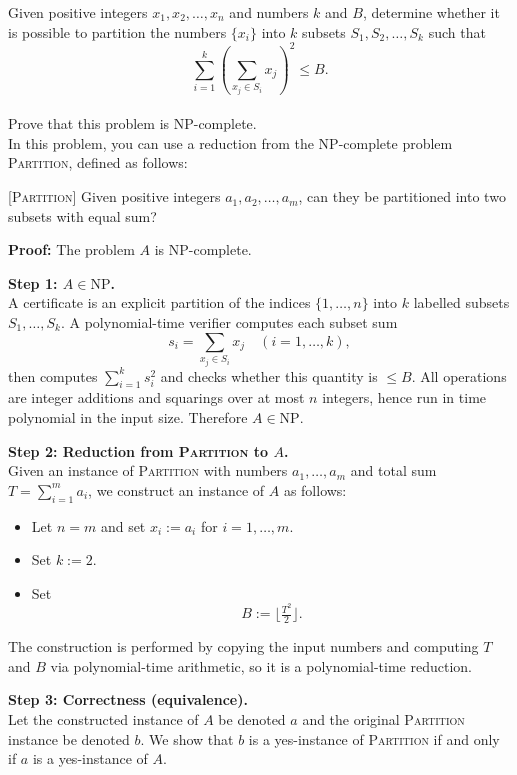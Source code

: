 \problem{}

Given positive integers $x_1, x_2, \ldots, x_n$ and numbers $k$ and $B$, determine whether it is possible to partition the numbers $\{x_i\}$ into $k$ subsets $S_1, S_2, \ldots, S_k$ such that
\[
\sum_{i=1}^{k} \left( \sum_{x_j \in S_i} x_j \right)^{2} \le B .
\]
\\
Prove that this problem is NP-complete. \\
In this problem, you can use a reduction from the NP-complete problem 
\textsc{Partition}, defined as follows:

[\textsc{Partition}]
Given positive integers \( a_1, a_2, \dots, a_m \), can they be partitioned into two subsets with equal sum?


\noindent \textbf{Proof:}
The problem \(A\) is NP-complete.

\noindent\textbf{Step 1: \(A \in \mathrm{NP}\).} \\
A certificate is an explicit partition of the indices \(\{1,\dots,n\}\) into \(k\) labelled subsets \(S_1,\dots,S_k\). A polynomial-time verifier computes each subset sum
\[
s_i=\sum_{x_j\in S_i} x_j \quad (i=1,\dots,k),
\]
then computes \(\sum_{i=1}^k s_i^2\) and checks whether this quantity is \(\le B\). All operations are integer additions and squarings over at most \(n\) integers, hence run in time polynomial in the input size. Therefore \(A\in\mathrm{NP}\).

\noindent\textbf{Step 2: Reduction from \textsc{Partition} to \(A\).} \\
Given an instance of \textsc{Partition} with numbers \(a_1,\dots,a_m\) and total sum \(T=\sum_{i=1}^m a_i\), we construct an instance of \(A\) as follows:
\begin{itemize}
  \item Let \(n=m\) and set \(x_i:=a_i\) for \(i=1,\dots,m\).
  \item Set \(k:=2\).
  \item Set
  \[
  B := \big\lfloor \tfrac{T^2}{2}\big\rfloor .
  \]
\end{itemize}
The construction is performed by copying the input numbers and computing \(T\) and \(B\) via polynomial-time arithmetic, so it is a polynomial-time reduction.

\noindent\textbf{Step 3: Correctness (equivalence).} \\
Let the constructed instance of \(A\) be denoted \(a\) and the original \textsc{Partition} instance be denoted \(b\). We show that \(b\) is a yes-instance of \textsc{Partition} if and only if \(a\) is a yes-instance of \(A\).

